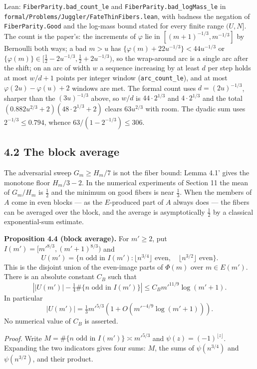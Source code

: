 \documentclass[11pt,a4paper]{article}
\begin{document}
Lean: \texttt{\nolinkurl{FiberParity.bad_count_le}} and
\texttt{\nolinkurl{FiberParity.bad_logMass_le}} in
\texttt{\nolinkurl{formal/Problems/Juggler/FateThinFibers.lean}}, with
badness the negation of \texttt{\nolinkurl{FiberParity.Good}} and the
log-mass bound stated for every finite range \((U,N]\). The count is the
paper's: the increments of \(\varphi\) lie in
\([(m+1)^{-1/3},m^{-1/3}]\) by Bernoulli both ways; a bad \(m>u\) has
\(\{\varphi(m)+22u^{-1/3}\}<44u^{-1/3}\) or
\(\{\varphi(m)\}\in[\tfrac12-2u^{-1/3},\tfrac12+2u^{-1/3})\), so the
wrap-around arc is a single arc after the shift; on an arc of width
\(w\) a sequence increasing by at least \(d\) per step holds at most
\(w/d+1\) points per integer window (\texttt{\nolinkurl{arc_count_le}}),
and at most \(\varphi(2u)-\varphi(u)+2\) windows are met. The formal
count uses \(d=(2u)^{-1/3}\), sharper than the \((3u)^{-1/3}\) above, so
\(w/d\) is \(44\cdot 2^{1/3}\) and \(4\cdot 2^{1/3}\) and the total
\((0.882u^{2/3}+2)(48\cdot 2^{1/3}+2)\) clears \(63u^{2/3}\) with room.
The dyadic sum uses \(2^{-1/3}\le 0.794\), whence
\(63/(1-2^{-1/3})\le 306\).

\subsection{4.2 The block average}\label{the-block-average}

The adversarial sweep \(G_m\ge H_m/7\) is not the fiber bound: Lemma
4.1' gives the monotone floor \(H_m/3-2\). In the numerical experiments
of Section 11 the mean of \(G_m/H_m\) is \(\tfrac12\) and the minimum on
good fibers is near \(\tfrac13\). When the members of \(A\) come in even
blocks --- as the \(E\)-produced part of \(A\) always does --- the
fibers can be averaged over the block, and the average is asymptotically
\(\tfrac12\) by a classical exponential-sum estimate.

\textbf{Proposition 4.4 (block average).} For \(m'\ge2\), put
\(I(m')=[m'^{8/3},(m'+1)^{8/3})\) and \[
U(m')=\{n\text{ odd in }I(m'):
 \lfloor n^{3/4}\rfloor\text{ even},\quad
 \lfloor n^{3/2}\rfloor\text{ even}\}.
\] This is the disjoint union of the even-image parts of \(\Phi(m)\)
over \(m\in E(m')\). There is an absolute constant \(C_B\) such that \[
\left||U(m')|-\tfrac14\#\{n\text{ odd in }I(m')\}\right|
 \le C_B m'^{11/9}\log(m'+1).
\tag{4.1}
\] In particular \[
|U(m')|=\tfrac13m'^{5/3}(1+O(m'^{-4/9}\log(m'+1))).
\] No numerical value of \(C_B\) is asserted.

\emph{Proof.} Write \(M=\#\{n\text{ odd in }I(m')\}\asymp m'^{5/3}\) and
\(\psi(z)=(-1)^{\lfloor z\rfloor}\). Expanding the two indicators gives
four sums: \(M\), the sums of \(\psi(n^{3/4})\) and \(\psi(n^{3/2})\),
and their product.
\end{document}

